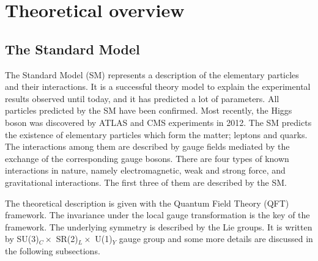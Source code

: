 \chapter{Theoretical overview}
\label{chap:theory}
\section{The Standard Model}
\label{sec:SM}
The Standard Model (SM) represents a description of the elementary particles and their interactions.
It is a successful theory model to explain the experimental results observed until today, and it has predicted a lot of parameters.
All particles predicted by the SM have been confirmed. Most recently, the Higgs boson was discovered by ATLAS and CMS experiments in 2012.
The SM predicts the existence of elementary particles which form the matter; leptons and quarks.
The interactions among them are described by gauge fields mediated by the exchange of the corresponding gauge bosons.
There are four types of known interactions in nature, namely electromagnetic, weak and strong force, and gravitational interactions.
The first three of them are described by the SM.

The theoretical description is given with the Quantum Field Theory (QFT) framework. 
The invariance under the local gauge transformation is the key of the framework. 
The underlying symmetry is described by the Lie groups. 
It is written by SU(3)$_C \times$ SR(2)$_L \times$ U(1)$_Y$ gauge group and some more details are discussed in the following subsections. 


